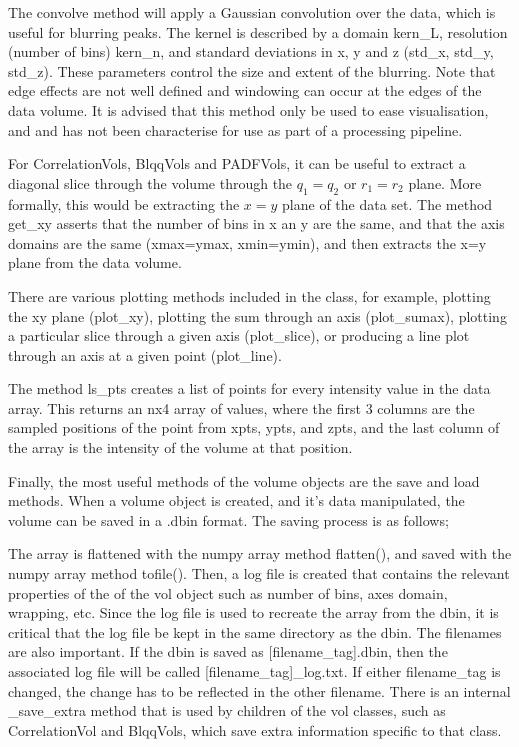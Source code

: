 \documentclass[a4, 12pt]{article}
\begin{document}
The convolve method will apply a Gaussian convolution over the data, which is useful for blurring peaks. The kernel is described by a domain kern\_L, resolution (number of bins) kern\_n, and standard deviations in x, y and z (std\_x, std\_y, std\_z). These parameters control the size and extent of the blurring. Note that edge effects are not well defined and windowing can occur at the edges of the data volume. It is advised that this method only be used to ease visualisation, and and has not been characterise for use as part of a processing pipeline.

For CorrelationVols, BlqqVols and PADFVols, it can be useful to extract a diagonal slice through the volume through the $q_1=q_2$ or $r_1=r_2$ plane. More formally, this would be extracting the $x=y$ plane of the data set. The method get\_xy asserts that the number of bins in x an y are the same, and that the axis domains are the same (xmax=ymax, xmin=ymin), and then extracts the x=y plane from the data volume.



There are various plotting methods included in the class, for example, plotting the xy plane (plot\_xy), plotting the sum through an axis (plot\_sumax), plotting a particular slice through a given axis (plot\_slice), or producing a line plot through an axis at a given point (plot\_line).

The method ls\_pts creates a list of points for every intensity value in the data array. This returns an nx4 array of values, where the first 3 columns are the sampled positions of the point from xpts, ypts, and zpts, and the last column of the array is the intensity of the volume at that position.

Finally, the most useful methods of the volume objects are the save and load methods. When a volume object is created, and it's data manipulated, the volume can be saved in a .dbin format. The saving process is as follows;

The array is flattened with the numpy array method flatten(), and saved with the numpy array method tofile(). Then, a log file is created that contains the relevant properties of the of the vol object such as number of bins, axes domain, wrapping, etc. Since the log file is used to recreate the array from the dbin, it is critical that the log file be kept in the same directory as the dbin. The filenames are also important. If the dbin is saved as [filename\_tag].dbin, then the associated log file will be called [filename\_tag]\_log.txt. If either filename\_tag is changed, the change has to be reflected in the other filename. There is an internal \_save\_extra method that is used by children of the vol classes, such as CorrelationVol and BlqqVols, which save extra information specific to that class.
\end{document}
